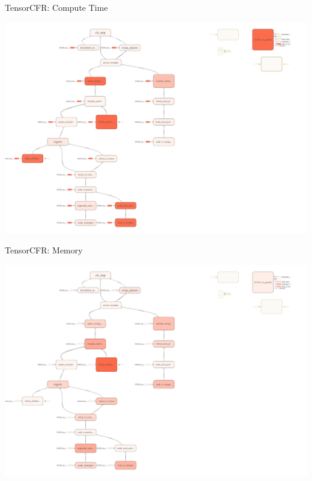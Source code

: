 \documentclass{beamer}
\begin{document}
{    \begin{frame}{TensorCFR: Compute Time}
      \begin{center}
        \includegraphics[width=\textwidth]{../img/tensorcfr_compute_time.png}
      \end{center}
    \end{frame}

    \begin{frame}{TensorCFR: Memory}
      \begin{center}
        \includegraphics[width=\textwidth]{../img/tensorcfr_memory.png}
      \end{center}
    \end{frame}

}
\end{document}
